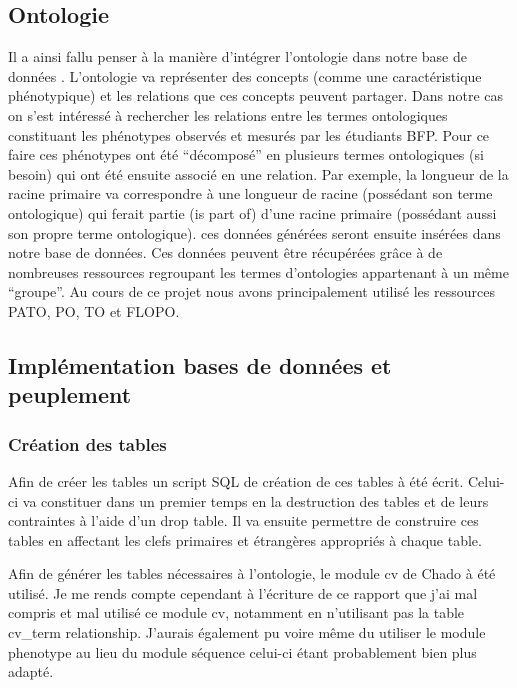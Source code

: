 \documentclass[11pt,french,]{article}
\begin{document}
\hypertarget{ontologie}{%
\subsection{Ontologie}\label{ontologie}}

Il a ainsi fallu penser à la manière d'intégrer l'ontologie dans notre
base de données . L'ontologie va représenter des concepts (comme une
caractéristique phénotypique) et les relations que ces concepts peuvent
partager. Dans notre cas on s'est intéressé à rechercher les relations
entre les termes ontologiques constituant les phénotypes observés et
mesurés par les étudiants BFP. Pour ce faire ces phénotypes ont été
``décomposé'' en plusieurs termes ontologiques (si besoin) qui ont été
ensuite associé en une relation. Par exemple, la longueur de la racine
primaire va correspondre à une longueur de racine (possédant son terme
ontologique) qui ferait partie (is part of) d'une racine primaire
(possédant aussi son propre terme ontologique). ces données générées
seront ensuite insérées dans notre base de données. Ces données peuvent
être récupérées grâce à de nombreuses ressources regroupant les termes
d'ontologies appartenant à un même ``groupe''. Au cours de ce projet
nous avons principalement utilisé les ressources PATO, PO, TO et FLOPO.

\hypertarget{implementation-bases-de-donnees-et-peuplement}{%
\subsection{Implémentation bases de données et
peuplement}\label{implementation-bases-de-donnees-et-peuplement}}

\hypertarget{creation-des-tables}{%
\subsubsection{Création des tables}\label{creation-des-tables}}

Afin de créer les tables un script SQL de création de ces tables à été
écrit. Celui-ci va constituer dans un premier temps en la destruction
des tables et de leurs contraintes à l'aide d'un drop table. Il va
ensuite permettre de construire ces tables en affectant les clefs
primaires et étrangères appropriés à chaque table.

Afin de générer les tables nécessaires à l'ontologie, le module cv de
Chado à été utilisé. Je me rends compte cependant à l'écriture de ce
rapport que j'ai mal compris et mal utilisé ce module cv, notamment en
n'utilisant pas la table cv\_term relationship. J'aurais également pu
voire même du utiliser le module phenotype au lieu du module séquence
celui-ci étant probablement bien plus adapté.
\end{document}
